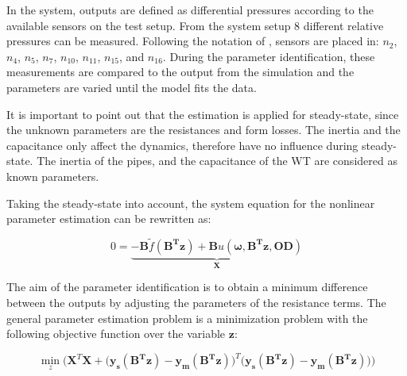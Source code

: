 In the system, outputs are defined as differential pressures according to the available sensors on the test setup. From the system setup $8$ different relative pressures can be measured. Following the notation of , sensors are placed in: 
$n_2$, $n_4$, $n_5$, $n_7$, $n_{10}$, $n_{11}$, $n_{15}$, and  $n_{16}$. During the parameter identification, these measurements are compared to the output from the simulation and the parameters are varied until the model fits the data.

It is important to point out that the estimation is applied for steady-state, since the unknown parameters are the resistances and form losses. The inertia and the capacitance only affect the dynamics, therefore have no influence during steady-state. The inertia of the pipes, and the capacitance of the WT are considered as known parameters. 

Taking the steady-state into account, the system equation for the nonlinear parameter estimation can be rewritten as: 

\begin{equation}
 0 = \underbrace {-\bm{B} \tilde f(\bm{B^T}\bm{z}) + \bm{B} u(\bm{\omega},\bm{B^T}\bm{z},\bm{OD}) }_{\mathcal{\bm{X}}}
 \label{InputOutputmodel_steadystate}
\end{equation}

The aim of the parameter identification is to obtain a minimum difference between the outputs by adjusting the parameters of the resistance terms. The general parameter estimation problem is a minimization problem with the following objective function over the variable $\bm{z}$: 

%
%
 \begin{equation}
 \min_{z} \Big(\mathcal{\bm{X}}^T \mathcal{\bm{X}} + \big(\bm{y_{s}(B^T z)} - \bm{y_{m}(B^T z)} \big)^T  \big(\bm{ y_{s}(B^T z)} - \bm{ y_{m}(B^T z)\big)}\Big)
  \label{ObjectiveFunction11}
 \end{equation}
 
